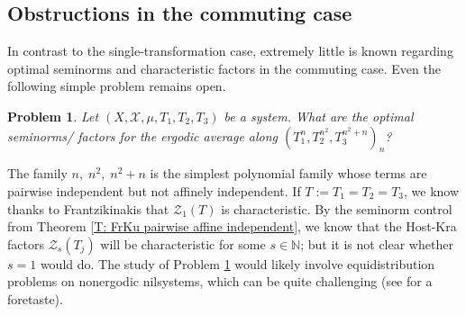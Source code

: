 \documentclass[11pt]{amsart}
\newtheorem{problem}{Problem}
\theoremstyle{definition}
\DeclareMathOperator*{\E}{\mathbb{E}}
\newcommand{\N}{{\mathbb N}}
\newcommand{\CX}{{\mathcal X}}
\newcommand{\CZ}{{\mathcal Z}}
\newcommand{\norm}[1]{\left\Vert #1\right\Vert}
\newcommand{\nnorm}[1]{\lvert\!|\!| #1|\!|\!\rvert}
\newcommand{\inv}{^{-1}}
\newcommand{\1}{{\mathbf{1}}}
\begin{document}
\subsection{Obstructions in the commuting case}
In contrast to the single-transformation case, extremely little is known regarding optimal seminorms and characteristic factors in the commuting case. Even the following simple problem remains open.
%
\begin{problem}\label{Pr: optimal factor n, n^2, n^2+n commuting}
    Let $(X, \CX, \mu, T_1, T_2, T_3)$ be a system. What are the optimal seminorms/ factors for the ergodic average along $(T_1^n, T_2^{n^2}, T_3^{n^2+n})_n$?
\end{problem}
The family $n,\; n^2,\; n^2+n$ is the simplest polynomial family whose terms are pairwise independent but not affinely independent. If $T:=T_1 = T_2 = T_3$, we know thanks to Frantzikinakis \cite[Theorem B]{Fr08} that  $\CZ_1(T)$ is characteristic. By the seminorm control from Theorem \ref{T: FrKu pairwise affine independent}, we know that the Host-Kra factors $\CZ_s(T_j)$ will be characteristic for some $s\in\N$; but it is not clear whether $s=1$ would do. The study of Problem \ref{Pr: optimal factor n, n^2, n^2+n commuting} would likely involve equidistribution problems on nonergodic nilsystems, which can be quite challenging (see \cite[Section 7]{CFH11} for a foretaste).
\end{document}
